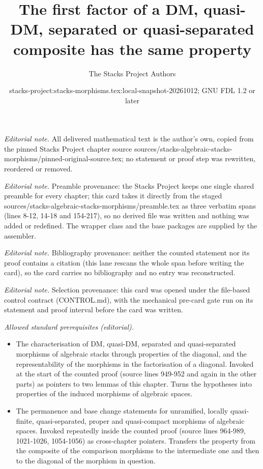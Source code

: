 \documentclass[10pt,a4paper]{amsart}
\title{The first factor of a DM, quasi-DM, separated or quasi-separated composite has the same property}
\author{The Stacks Project Authors}
\date{stacks-project:stacks-morphisms.tex:local-snapshot-20261012; GNU FDL 1.2 or later}
\theoremstyle{plain}
\theoremstyle{definition}
\theoremstyle{remark}
\numberwithin{equation}{subsection}
\begin{document}
\maketitle
\noindent\textit{Editorial note.} All delivered mathematical text is the author's own, copied from the pinned Stacks Project chapter source sources/stacks-algebraic-stacks-morphisms/pinned-original-source.tex; no statement or proof step was rewritten, reordered or removed.\par\medskip
\noindent\textit{Editorial note.} Preamble provenance: the Stacks Project keeps one single shared preamble for every chapter; this card takes it directly from the staged sources/stacks-algebraic-stacks-morphisms/preamble.tex as three verbatim spans (lines 8-12, 14-18 and 154-217), so no derived file was written and nothing was added or redefined. The wrapper class and the base packages are supplied by the assembler.\par\medskip
\noindent\textit{Editorial note.} Bibliography provenance: neither the counted statement nor its proof contains a citation (this lane rescans the whole span before writing the card), so the card carries no bibliography and no entry was reconstructed.\par\medskip
\noindent\textit{Editorial note.} Selection provenance: this card was opened under the file-based control contract (CONTROL.md), with the mechanical pre-card gate run on its statement and proof interval before the card was written.\par\medskip
\noindent\textit{Allowed standard prerequisites (editorial).}\begin{itemize}
\item The characterisation of DM, quasi-DM, separated and quasi-separated morphisms of algebraic stacks through properties of the diagonal, and the representability of the morphisms in the factorisation of a diagonal. Invoked at the start of the counted proof (source lines 949-952 and again in the other parts) as pointers to two lemmas of this chapter. Turns the hypotheses into properties of the induced morphisms of algebraic spaces.
\item The permanence and base change statements for unramified, locally quasi-finite, quasi-separated, proper and quasi-compact morphisms of algebraic spaces. Invoked repeatedly inside the counted proof (source lines 964-989, 1021-1026, 1054-1056) as cross-chapter pointers. Transfers the property from the composite of the comparison morphisms to the intermediate one and then to the diagonal of the morphism in question.
\end{itemize}\medskip
\end{document}
